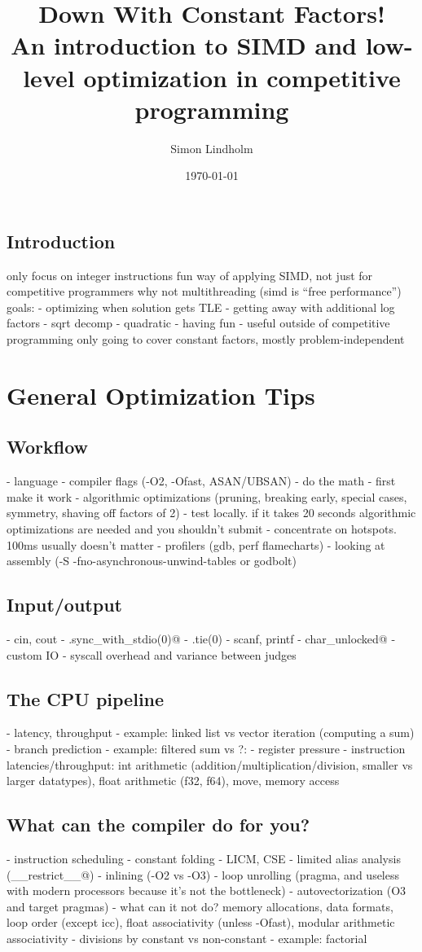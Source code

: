 \documentclass[openany]{book}
\title{
    Down With Constant Factors! \\
    \large An introduction to SIMD and low-level optimization in competitive programming
}
\author{Simon Lindholm}
\date{\today}
\begin{document}
\maketitle

\tableofcontents

\chapter{Introduction}
only focus on integer instructions
fun way of applying SIMD, not just for competitive programmers
why not multithreading (simd is ``free performance'')
goals:
- optimizing when solution gets TLE
- getting away with additional log factors
- sqrt decomp
- quadratic
- having fun
- useful outside of competitive programming
only going to cover constant factors, mostly problem-independent

\part{General Optimization Tips}
\chapter{Workflow}
- language
- compiler flags (-O2, -Ofast, ASAN/UBSAN)
- do the math
- first make it work
- algorithmic optimizations (pruning, breaking early, special cases, symmetry, shaving off factors of 2)
- test locally. if it takes 20 seconds algorithmic optimizations are needed and you shouldn't submit
- concentrate on hotspots. 100ms usually doesn't matter
- profilers (gdb, perf flamecharts)
- looking at assembly (-S -fno-asynchronous-unwind-tables or godbolt)
\chapter{Input/output}
- cin, cout
- \verb@.sync_with_stdio(0)@
- .tie(0)
- scanf, printf
- char_unlocked@
- custom IO
- syscall overhead and variance between judges
\chapter{The CPU pipeline}
- latency, throughput
- example: linked list vs vector iteration (computing a sum)
- branch prediction
- example: filtered sum vs ?:
- register pressure
- instruction latencies/throughput: int arithmetic (addition/multiplication/division, smaller vs larger datatypes), float arithmetic (f32, f64), move, memory access
\chapter{What can the compiler do for you?}
- instruction scheduling
- constant folding
- LICM, CSE
- limited alias analysis (\verb@__restrict__@)
- inlining (-O2 vs -O3)
- loop unrolling (pragma, and useless with modern processors because it's not the bottleneck)
- autovectorization (O3 and target pragmas)
- what can it not do? memory allocations, data formats, loop order (except icc), float associativity (unless -Ofast), modular arithmetic associativity
- divisions by constant vs non-constant
- example: factorial
\end{document}
